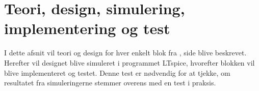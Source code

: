 \section{Teori, design, simulering, implementering og test }
I dette afsnit vil teori og design for hver enkelt blok fra , side \pageref{kravblok} blive beskrevet. Herefter vil designet blive simuleret i programmet LTspice, hvorefter blokken vil blive implementeret og testet. Denne test er nødvendig for at tjekke, om resultatet fra simuleringerne stemmer overens med en test i praksis. %